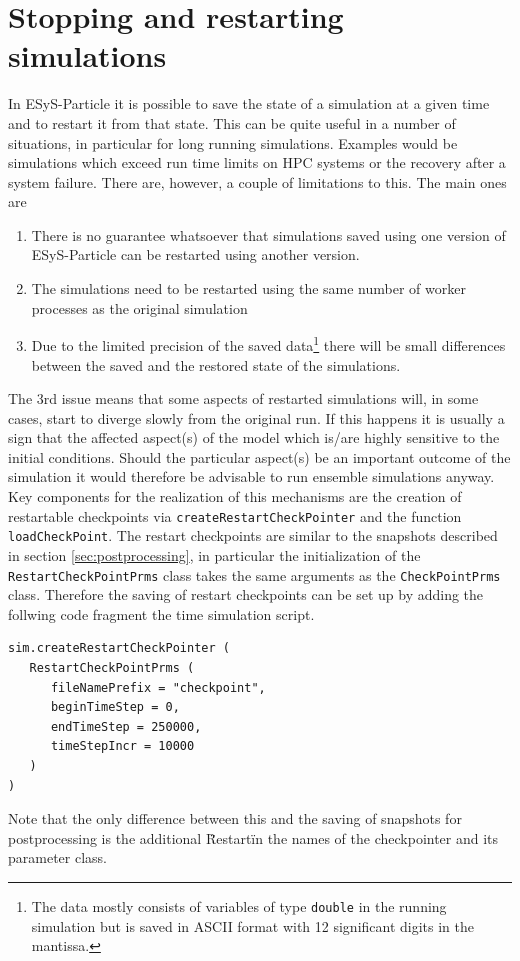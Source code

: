 \section{Stopping and restarting simulations}

In ESyS-Particle it is possible to save the state of a simulation at a given time and to restart it from that state. This can be quite useful in a number of situations, in particular for long running simulations. Examples would be simulations which exceed run time limits on HPC systems or the recovery after a system failure. There are, however, a couple of limitations to this. The  main ones are 
\begin{enumerate}
 \item There is no guarantee whatsoever that simulations saved using one version of ESyS-Particle can be restarted using another version. 
 \item The simulations need to be restarted using the same number of worker processes as the original simulation
 \item Due to the limited precision of the saved data\footnote{The data mostly consists of variables of type \texttt{double} in the running simulation but is saved in ASCII format with 12 significant digits in the mantissa.} there will be small differences between the saved and the restored state of the  simulations.
 \end{enumerate} 
The 3rd issue means that some aspects of restarted simulations will, in some cases, start to diverge slowly from the original run. If this happens it is usually a sign that the affected aspect(s) of the model which is/are highly sensitive to the initial conditions. Should the particular aspect(s) be an important outcome of the simulation it would therefore be advisable to run ensemble simulations anyway.     \\
Key components for the realization of this mechanisms are the creation of restartable checkpoints via \texttt{createRestartCheckPointer} and the function \texttt{loadCheckPoint}. The restart checkpoints are similar to the snapshots described in section \ref{sec:postprocessing}, in particular the initialization of the \texttt{RestartCheckPointPrms} class takes the same arguments as the \texttt{CheckPointPrms} class. Therefore the saving of restart checkpoints can be set up by adding the follwing code fragment the time simulation script.
\begin{verbatim}
sim.createRestartCheckPointer (
   RestartCheckPointPrms (
      fileNamePrefix = "checkpoint",
      beginTimeStep = 0,
      endTimeStep = 250000,
      timeStepIncr = 10000
   )
)
\end{verbatim}  
Note that the only difference between this and the saving of snapshots for postprocessing is the additional \"Restart\" in the names of the checkpointer and its parameter class.     




\newpage
